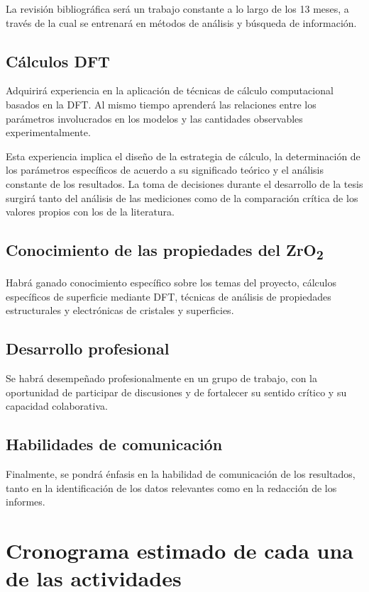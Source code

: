 La revisión bibliográfica será un trabajo constante a lo largo de los 13 meses, 
a través de la cual se entrenará en métodos de análisis y búsqueda de 
información.

\subsection{ Cálculos DFT}

Adquirirá experiencia en la aplicación de técnicas de cálculo computacional 
basados en la DFT. Al mismo tiempo aprenderá las relaciones entre los 
parámetros involucrados en los modelos y las cantidades observables 
experimentalmente.

Esta experiencia implica el diseño de la estrategia de cálculo, la 
determinación de los parámetros específicos de acuerdo a su significado teórico 
y el análisis constante de los resultados. La toma de decisiones durante el 
desarrollo de la tesis surgirá tanto del análisis de las mediciones como de la 
comparación crítica de los valores propios con los de la literatura.

\subsection{Conocimiento de las propiedades del  ZrO\textsubscript{2}}

Habrá ganado conocimiento específico sobre los temas del proyecto, 
cálculos específicos de superficie mediante DFT, técnicas de análisis
de propiedades estructurales y electrónicas de cristales y superficies. 

\subsection{ Desarrollo profesional}

Se habrá desempeñado profesionalmente en un grupo de trabajo, con la 
oportunidad de participar de discusiones y de fortalecer su sentido crítico y 
su capacidad colaborativa.

\subsection{ Habilidades de comunicación }

Finalmente, se pondrá énfasis en la habilidad de comunicación de los 
resultados, tanto en la identificación de los datos relevantes como en la 
redacción de los informes. 

\section{Cronograma estimado de cada una de las actividades}
 
